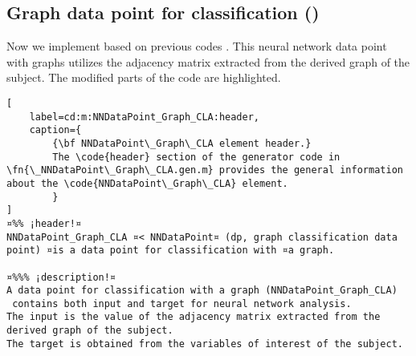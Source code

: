 \documentclass{tufte-handout}
\begin{document}
\clearpage

\subsection{Graph data point for classification ()}

Now we implement  based on previous codes .
This neural network data point with graphs utilizes the adjacency matrix extracted from the derived graph of the subject. 
The modified parts of the code are highlighted.

\begin{lstlisting}[
	label=cd:m:NNDataPoint_Graph_CLA:header,
	caption={
		{\bf NNDataPoint\_Graph\_CLA element header.}
		The \code{header} section of the generator code in \fn{\_NNDataPoint\_Graph\_CLA.gen.m} provides the general information about the \code{NNDataPoint\_Graph\_CLA} element.
		}
]
¤%% ¡header!¤
NNDataPoint_Graph_CLA ¤< NNDataPoint¤ (dp, graph classification data point) ¤is a data point for classification with ¤a graph.

¤%%% ¡description!¤
A data point for classification with a graph (NNDataPoint_Graph_CLA) 
 contains both input and target for neural network analysis.
The input is the value of the adjacency matrix extracted from the derived graph of the subject.
The target is obtained from the variables of interest of the subject.
\end{lstlisting}
\end{document}
